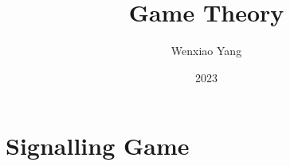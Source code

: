 \documentclass[11pt]{elegantbook}
\title{\textbf{Game Theory}}
\author{Wenxiao Yang}
\institute{Haas School of Business, University of California Berkeley}
\date{2023}
\begin{document}
\maketitle
\frontmatter
\tableofcontents
\mainmatter



\chapter{Signalling Game}
\end{document}
